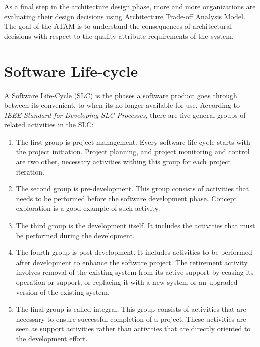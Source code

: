 As a final step in the architecture design phase, more and more organizations are evaluating their design decisions using Architecture Trade-off Analysis Model\cite{Bass:2012:SAP:2392670,sherman2008quality}. The goal of the ATAM is to understand the consequences of architectural decisions with respect to the quality attribute requirements of the system.






\section{Software Life-cycle}
\label{sec:2-SLC}
A Software Life-Cycle (SLC) is the phases a software product goes through between its convenient, to when its no longer available for use\cite{159431}. According to \textit{IEEE Standard for Developing SLC Processes}\cite{159431}, there are five general groups of related activities in the SLC: 

\begin{enumerate}
	\item The first group is project management. Every software life-cycle starts with the project initiation. Project planning, and project monitoring and control are two other, necessary activities withing this group for each project iteration. 
	\item The second group is pre-development. This group consists of activities that needs to be performed before the software development phase. Concept exploration is a good example of such activity. 
	\item The third group is the development itself. It includes the activities that must be performed during the development.
	\item The fourth group is post-development. It includes activities to be performed after development to enhance the software project. The retirement activity involves removal of the existing system from its active support by ceasing its operation or support, or replacing it with a new system or an upgraded version of the existing system. 
	\item The final group is called integral. This group consists of activities that are necessary to ensure successful completion of a project. These activities are seen as support activities rather than activities that are directly oriented to the development effort.
\end{enumerate}


